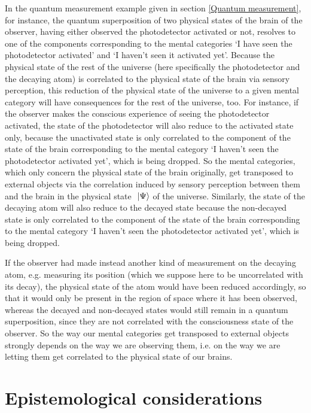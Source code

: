 \documentclass[10pt,a4paper,twoside,openany]{book}
\begin{document}
In the quantum measurement example given in section \ref{Quantum measurement}, for instance, the quantum superposition of two physical states of the brain of the observer, having either observed the photodetector activated or not, resolves to one of the components corresponding to the mental categories `I have seen the photodetector activated' and `I haven't seen it activated yet'. Because the physical state of the rest of the universe (here specifically the photodetector and the decaying atom) is correlated to the physical state of the brain via sensory perception, this reduction of the physical state of the universe to a given mental category will have consequences for the rest of the universe, too. For instance, if the observer makes the conscious experience of seeing the photodetector activated, the state of the photodetector will also reduce to the activated state only, because the unactivated state is only correlated to the component of the state of the brain corresponding to the mental category `I haven't seen the photodetector activated yet', which is being dropped. So the mental categories, which only concern the physical state of the brain originally, get transposed to external objects via the correlation induced by sensory perception between them and the brain in the physical state $\ \left|{\Psi}\right\rangle$ of the universe. Similarly, the state of the decaying atom will also reduce to the decayed state because the non-decayed state is only correlated to the component of the state of the brain corresponding to the mental category `I haven't seen the photodetector activated yet', which is being dropped.

If the observer had made instead another kind of measurement on the decaying atom, e.g. measuring its position (which we suppose here to be uncorrelated with its decay), the physical state of the atom would have been reduced accordingly, so that it would only be present in the region of space where it has been observed, whereas the decayed and non-decayed states would still remain in a quantum superposition, since they are not correlated with the consciousness state of the observer. So the way our mental categories get transposed to external objects strongly depends on the way we are observing them, i.e. on the way we are letting them get correlated to the physical state of our brains.

\section{Epistemological considerations}
\end{document}
